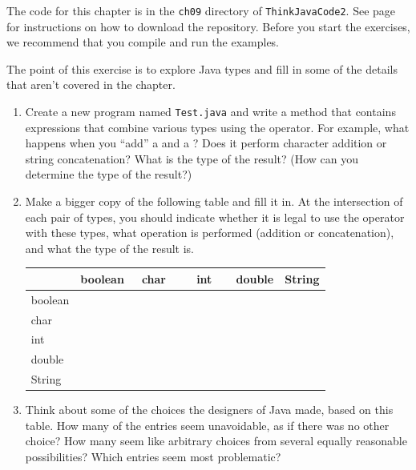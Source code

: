 The code for this chapter is in the {\tt ch09} directory of {\tt ThinkJavaCode2}.
See page~\pageref{code} for instructions on how to download the repository.
Before you start the exercises, we recommend that you compile and run the examples.


\begin{exercise}  %

The point of this exercise is to explore Java types and fill in some of the details that aren't covered in the chapter.


\begin{enumerate}

\item Create a new program named {\tt Test.java} and write a  method that contains expressions that combine various types using the \java{+} operator.
For example, what happens when you ``add'' a  and a ?
Does it perform character addition or string concatenation?
What is the type of the result?
(How can you determine the type of the result?)

\item Make a bigger copy of the following table and fill it in.
At the intersection of each pair of types, you should indicate whether it is legal to use the \java{+} operator with these types, what operation is performed (addition or concatenation), and what the type of the result is.

\begin{center}
\begin{tabular}{|l|l|l|l|l|l|} \hline
        &  boolean  &  ~char~  &  ~~int~~  &  double  &  String \\ \hline
boolean &           &          &           &          &         \\ \hline
char    &           &          &           &          &         \\ \hline
int     &           &          &           &          &         \\ \hline
double  &           &          &           &          &         \\ \hline
String  &           &          &           &          &         \\ \hline
\end{tabular}
\end{center}

\item Think about some of the choices the designers of Java made, based on this table.
How many of the entries seem unavoidable, as if there was no other choice?
How many seem like arbitrary choices from several equally reasonable possibilities?
Which entries seem most problematic?


\end{enumerate}
\end{exercise}
